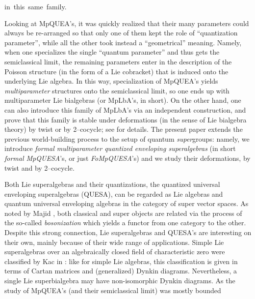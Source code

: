 \documentclass[12pt,reqno,twoside,a4paper]{amsart}
\numberwithin{equation}{section}
\theoremstyle{definition}
\newtheorem{free text}[lema]{}
\theoremstyle{remark}
\def \ZZ {\mathbb{Z}}
\theoremstyle{plain}
\begin{document}
                                               \hbox{in this same family.}
                                                                          \par
   Looking at MpQUEA's, it was quickly realized that their many parameters could always be
   re-arranged so that only one of them kept the role of ``quantization parameter'',
   while all the other took instead a ``geometrical'' meaning.
   Namely, when one specializes the single ``quantum parameter''
   and thus gets the semiclassical limit, the remaining parameters enter in the description
   of the Poisson structure (in the form of a Lie cobracket) that is induced
 onto the underlying Lie algebra.  In this way, specialization
 of MpQUEA's yields  \textsl{multiparameter\/}
 structures onto the semiclassical limit, so one ends up with multiparameter
 Lie bialgebras (or MpLbA's, in short).  On the other hand, one can also introduce
 this family of MpLbA's via an independent construction, and prove that this family
 is stable under deformations (in the sense of Lie bialgebra theory) by twist or by
 2--cocycle; see  \cite{GG3}  for details.
%
 \vskip5pt
%
  The present paper extends the previous world-building process to the setup
  of quantum  \textsl{super\/}groups:  namely, we introduce  \textit{formal multiparameter quantized enveloping  \textsl{super}algebras\/}  (in short  \textit{formal MpQUESA}'s,  or just  \textit{FoMpQUESA}'s) and we study their deformations, by twist and by 2--cocycle.
                                                                            \par
   Both Lie superalgebras and their quantizations, the quantized universal enveloping superalgebras (QUESA),
can be regarded as Lie algebras and quantum universal enveloping algebras in the category of super vector spaces.
%
%
 As noted by Majid \cite{Mj}, both classical and super objects are related via the
process of the so-called \emph{bosonization} which yields a functor from one category to the
other. Despite this strong connection, Lie superalgebras and QUESA's are interesting on their own,
mainly because of their wide range of applications.
Simple Lie superalgebras over an algebraically closed field of characteristic zero
were classified by Kac in \cite{Ka2}:  like for simple Lie algebras, this classification is given in terms of Cartan matrices and (generalized) Dynkin diagrams.  Nevertheless, a single Lie superbialgebra may have non-isomorphic Dynkin diagrams.
 As the study of MpQUEA's (and their semiclassical limit) was mostly bounded
\end{document}
